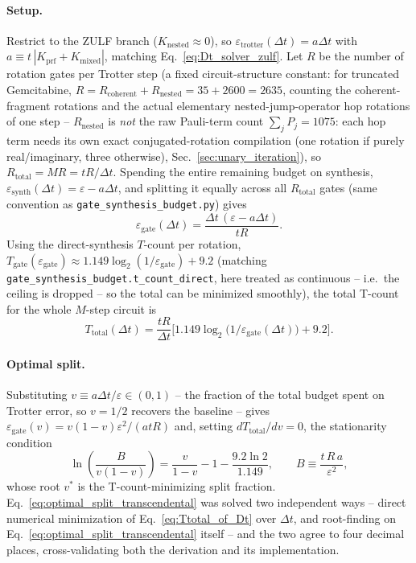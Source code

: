 \documentclass[11pt]{article}
\newcommand{\Dt}{\Delta t}
\begin{document}
\paragraph{Setup.} Restrict to the ZULF branch ($K_{\text{nested}}\approx0$), so $\varepsilon_{\text{trotter}}(\Dt) = a\Dt$ with $a\equiv t\,|K_{\text{prf}}+K_{\text{mixed}}|$, matching Eq.~\eqref{eq:Dt_solver_zulf}. Let $R$ be the number of rotation gates per Trotter step (a fixed circuit-structure constant: for truncated Gemcitabine, $R=R_{\text{coherent}}+R_{\text{nested}}=35+2600=2635$, counting the coherent-fragment rotations and the actual elementary nested-jump-operator hop rotations of one step -- $R_{\text{nested}}$ is \emph{not} the raw Pauli-term count $\sum_jP_j=1075$: each hop term needs its own exact conjugated-rotation compilation (one rotation if purely real/imaginary, three otherwise), Sec.~\ref{sec:unary_iteration}), so $R_{\text{total}}=MR=tR/\Dt$. Spending the entire remaining budget on synthesis, $\varepsilon_{\text{synth}}(\Dt)=\varepsilon-a\Dt$, and splitting it equally across all $R_{\text{total}}$ gates (same convention as \texttt{gate\_synthesis\_budget.py}) gives
\begin{equation}\label{eq:eps_gate_of_Dt}
    \varepsilon_{\text{gate}}(\Dt) = \frac{\Dt\,(\varepsilon-a\Dt)}{tR}.
\end{equation}
Using the direct-synthesis $T$-count per rotation, $T_{\text{gate}}(\varepsilon_{\text{gate}})\approx 1.149\log_2(1/\varepsilon_{\text{gate}}) + 9.2$ (matching \texttt{gate\_synthesis\_budget.t\_count\_direct}, here treated as continuous -- i.e.\ the ceiling is dropped -- so the total can be minimized smoothly), the total T-count for the whole $M$-step circuit is
\begin{equation}\label{eq:Ttotal_of_Dt}
    T_{\text{total}}(\Dt) = \frac{tR}{\Dt}\Big[1.149\log_2\!\big(1/\varepsilon_{\text{gate}}(\Dt)\big) + 9.2\Big].
\end{equation}

\paragraph{Optimal split.} Substituting $v\equiv a\Dt/\varepsilon\in(0,1)$ -- the fraction of the total budget spent on Trotter error, so $v=1/2$ recovers the baseline -- gives $\varepsilon_{\text{gate}}(v)=v(1-v)\varepsilon^2/(atR)$ and, setting $dT_{\text{total}}/dv=0$, the stationarity condition
\begin{equation}\label{eq:optimal_split_transcendental}
    \ln\!\left(\frac{B}{v(1-v)}\right) = \frac{v}{1-v} - 1 - \frac{9.2\ln 2}{1.149}, \qquad B \equiv \frac{t\,R\,a}{\varepsilon^2},
\end{equation}
whose root $v^\ast$ is the T-count-minimizing split fraction. Eq.~\eqref{eq:optimal_split_transcendental} was solved two independent ways -- direct numerical minimization of Eq.~\eqref{eq:Ttotal_of_Dt} over $\Dt$, and root-finding on Eq.~\eqref{eq:optimal_split_transcendental} itself -- and the two agree to four decimal places, cross-validating both the derivation and its implementation.
\end{document}
